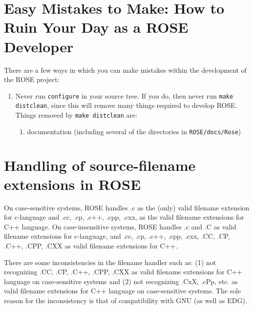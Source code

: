 \section{Easy Mistakes to Make: How to Ruin Your Day as a ROSE Developer}

   There are a few ways in which you can make mistakes within the development of
the ROSE project:

\begin{enumerate}
     \item Never run {\tt configure} in your source tree.  If you do, then never run 
     {\tt make distclean}, since this will remove many things required to develop 
     ROSE. Things removed by {\tt make distclean} are:
     \begin{enumerate}
          \item documentation (including several of the directories in {\tt ROSE/docs/Rose})
     \end{enumerate}
\end{enumerate}

\section{Handling of source-filename extensions in ROSE}
    On case-sensitive systems, ROSE handles .c as the (only) valid filename extension
for c-language and .cc, .cp, .c++, .cpp, .cxx, as the valid filename extensions for
C++ language. On case-insensitive systems, ROSE handles .c and .C as valid filename
extensions for c-language, and .cc, .cp, .c++, .cpp, .cxx, .CC,
.CP, .C++, .CPP, .CXX as valid filename extensions for C++.

There are some inconsistencies in the filename handler such as: (1) not recognizing
.CC, .CP, .C++, .CPP, .CXX as valid filename extensions for C++ language on case-sensitive
systems and  (2) not recognizing .CxX, .cPp, etc. as valid filename extensions for
C++ language on case-sensitive systems. The sole reason for the inconsistency is that
of compatibility with GNU (as well as EDG).



